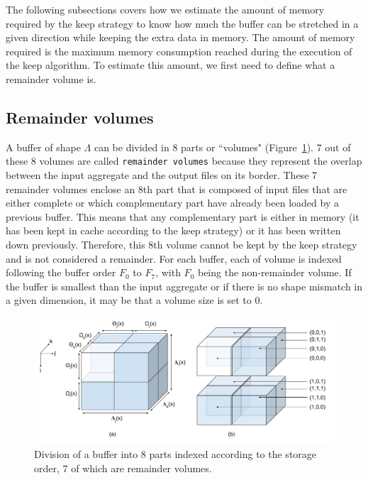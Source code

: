 \documentclass[conference]{IEEEtran}
\begin{document}
The following subsections covers how we estimate the amount of memory required
by the keep strategy to know how much the buffer can be stretched in a given
direction while keeping the extra data in memory. The amount of memory required
is the maximum memory consumption reached during the execution of the keep algorithm.
To estimate this amount, we first need to define what a remainder volume is.

\subsection{Remainder volumes}

A buffer of shape $\Lambda$ can be divided in
8 parts or ``volumes" (Figure~\ref{fig:nomenclature_overlaps}).
7 out of these 8 volumes are called \texttt{remainder volumes} because
they represent the overlap between the input aggregate and the output files on
its border. These 7 remainder volumes enclose an 8th part that is composed of
input files that are either complete or which complementary part have already
been loaded by a previous buffer. This means that any complementary part is either
in memory (it has been kept in cache according to the keep strategy) or it has
been written down previously. Therefore, this 8th volume cannot be kept by the
keep strategy and is not considered a remainder. For each buffer, each of volume
is indexed following the buffer order $F_0$ to $F_7$, with $F_0$ being the
non-remainder volume. If the buffer is smallest than the input aggregate or if
there is no shape mismatch in a given dimension, it may be that a volume size
is set to 0.

\begin{figure}[h]
\centering
\includegraphics[scale=0.4]{./figures/new/nomenclature_overlaps.png}
\caption{Division of a buffer into 8 parts indexed according to the storage
order, 7 of which are remainder volumes.}
\label{fig:nomenclature_overlaps}
\end{figure}
\end{document}
